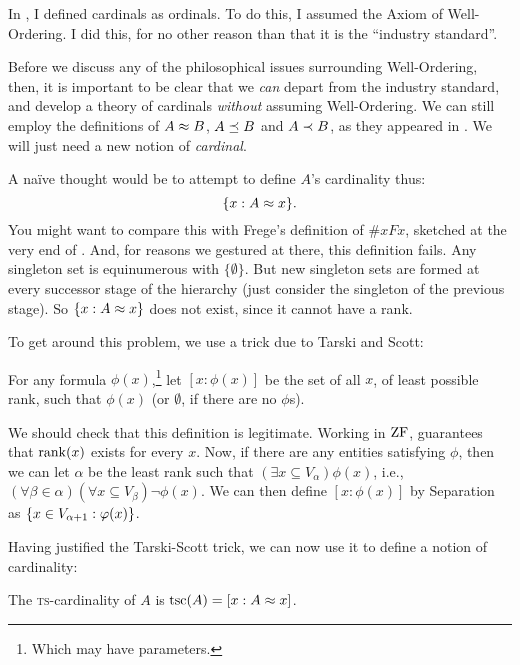 \documentclass[../../../include/open-logic-section]{subfiles}
\begin{document}

In , I
defined cardinals as ordinals. To do this, I assumed the Axiom of
Well-Ordering. I did this, for no other reason than that it is the
``industry standard''.

Before we discuss any of the philosophical issues surrounding
Well-Ordering, then, it is important to be clear that we \emph{can}
depart from the industry standard, and develop a theory of cardinals
\emph{without} assuming Well-Ordering. We can still employ the
definitions of $A \approx B$, $A \preceq B$ and $A \prec B$,
as they appeared in . We will just need a new
notion of \emph{cardinal}.

A na\"ive thought would be to attempt to define $A$'s cardinality thus:
\[
	\{ x : A \approx x \}.
\]
You might want to compare this with Frege's definition of $\# x Fx$,
sketched at the very end of . And, for
reasons we gestured at there, this definition fails. Any singleton set
is equinumerous with $\{\emptyset\}$. But new singleton sets are
formed at every successor stage of the hierarchy (just consider the
singleton of the previous stage). So $\{ x : A \approx x \}$ does
not exist, since it cannot have a rank.

To get around this problem, we use a trick due to Tarski and Scott:

\begin{defn}
For any formula $\phi(x)$,\footnote{Which may have parameters.} let
$[ x : \phi(x)] $ be the set of all $x$, of least possible rank, such
that $\phi(x)$ (or $\emptyset$, if there are no $\phi$s).
\end{defn}

We should check that this definition is legitimate. Working in $\mathrm{ZF}$,
 guarantees that
$\mathrm{rank}(x)$ exists for every $x$. Now, if there are any entities
satisfying $\phi$, then we can let $\alpha$ be the least rank such
that  $(\exists x\subseteq V_\alpha)\phi(x)$, i.e., $(\forall \beta
\in \alpha)(\forall x \subseteq V_\beta)\lnot \phi(x)$. We can then
define $[x : \phi(x)]$ by Separation as $\{ x \in
V_{\alpha+1} : \varphi(x) \}$. 

Having justified the Tarski-Scott trick, we can now use it to define
a notion of cardinality:

\begin{defn}
The \textsc{ts}-cardinality of $A$ is $\text{tsc}(A) = [x :
A \approx x]$.
\end{defn}
\end{document}
